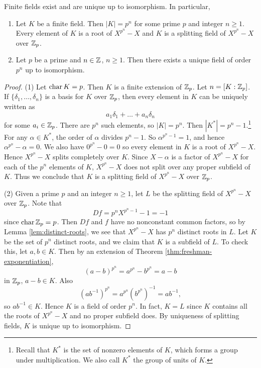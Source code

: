\begin{theorem}
  Finite fields exist and are unique up to isomorphism.
  In particular,
  \begin{enumerate}
      \item Let $K$ be a finite field. Then $|K| = p^n$ for
    some prime $p$ and integer $n \ge 1$. Every element
    of $K$ is a root of $X^{p^n} - X$ and $K$ is a
    splitting field of $X^{p^n} - X$ over $\mathbb{Z}_p$.
    \item Let $p$ be a prime and $n \in \mathbb{Z}$, $n \ge 1$.
      Then there exists a unique field of
      order $p^n$ up to isomorphism.
  \end{enumerate}
\end{theorem}

\begin{proof}
  (1) Let $\operatorname{char} K = p$. Then $K$ is a finite extension
  of $\mathbb{Z}_p$. Let $n = [K : \mathbb{Z}_p]$. If
  $\{\delta_1, \dots, \delta_n\}$ is a basis for $K$
  over $\mathbb{Z}_p$, then every element in $K$ can be
  uniquely written as
  \[
    a_1 \delta_1 + \dots + a_n \delta_n
  \]
  for some $a_i \in \mathbb{Z}_p$. There are $p^n$ such elements,
  so $|K| = p^n$. Then $|K^*| = p^n - 1$.\footnote{Recall that $K^*$ is the set of nonzero elements of $K$, which forms a group under multiplication. We also call $K^*$ the group of units of $K$.}
  For
  any $\alpha \in K^*$, the order of $\alpha$ divides
  $p^n - 1$. So $\alpha^{p^n - 1} = 1$, and hence
  $\alpha^{p^n} - \alpha = 0$. We also have
  $0^{p^n} - 0 = 0$ so every element in $K$ is a
  root of $X^{p^n} - X$. Hence $X^{p^n} - X$ splits
  completely over $K$. Since $X - \alpha$ is a factor
  of $X^{p^n} - X$ for each of the $p^n$ elements of $K$,
  $X^{p^n} - X$ does not split over any proper
  subfield of $K$. Thus we conclude that $K$ is a
  splitting field of $X^{p^n} - X$ over $\mathbb{Z}_p$.

  (2) Given a prime $p$ and an integer $n \ge 1$, let
  $L$ be the splitting field of $X^{p^n} - X$ over
  $\mathbb{Z}_p$. Note that
  \[
    Df = p^n X^{p^n - 1} - 1 = -1
  \]
  since $\operatorname{char} \mathbb{Z}_p = p$. Then $Df$ and $f$ have no
  nonconstant common factors, so by Lemma
  \ref{lem:distinct-roots}, we see that $X^{p^n} - X$ has
  $p^n$ distinct roots in $L$. Let $K$ be the set of
  $p^n$ distinct roots, and we claim that $K$ is a
  subfield of $L$. To check this, let $a, b \in K$.
  Then by an extension of Theorem \ref{thm:freshman-exponentiation},
  \[
    (a - b)^{p^n} = a^{p^n} - b^{p^n} = a - b
  \]
  in $\mathbb{Z}_p$, $a - b \in K$. Also
  \[
    (ab^{-1})^{p^n} = a^{p^n} (b^{p^n})^{-1} = ab^{-1},
  \]
  so $ab^{-1} \in K$. Hence $K$ is a field of order
  $p^n$. In fact, $K = L$ since $K$ contains all the
  roots of $X^{p^n} - X$ and no proper subfield does.
  By uniqueness of splitting fields, $K$ is unique up
  to isomorphism.
\end{proof}

